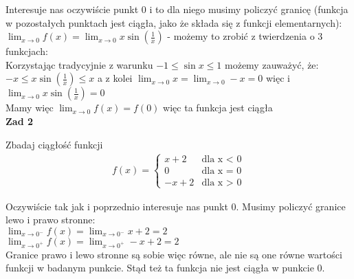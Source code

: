 \documentclass[main.tex]{subfiles}
\begin{document}
    \noindent Interesuje nas oczywiście punkt 0 i to dla niego musimy policzyć granicę (funkcja w pozostałych punktach jest ciągła, jako że składa się z funkcji elementarnych): \\

    \noindent $\lim_{x \to 0} f(x) = \lim_{x \to 0} x \sin(\frac{1}{x})$ - możemy to zrobić z twierdzenia o 3 funkcjach: \\

    \noindent Korzystając tradycyjnie z warunku $-1 \leq \sin{x} \leq 1$ możemy zauważyć, że: \\

    \noindent $-x \leq x \sin(\frac{1}{x}) \leq x$ a z kolei $\lim_{x \to 0} x = \lim_{x \to 0} -x = 0$ więc i $\lim_{x \to 0} x \sin(\frac{1}{x}) = 0$ \\

    \noindent Mamy więc $\lim_{x \to 0} f(x) = f(0)$ więc ta funkcja jest ciągła \\


    \noindent \textbf{Zad 2}

    \begin{exercise}
        Zbadaj ciągłość funkcji \begin{align*}
                                    f(x) =
                                    \begin{cases}
                                        x + 2 & \text{dla x $<$ 0} \\
                                        0 & \text{dla x = 0} \\
                                        -x + 2 & \text{dla x $>$ 0}
                                    \end{cases}
        \end{align*}
    \end{exercise}

    \noindent Oczywiście tak jak i poprzednio interesuje nas punkt 0. Musimy policzyć granice lewo i prawo stronne: \\

    \noindent $\lim_{x \to 0^{-}} f(x) = \lim_{x \to 0^{-}} x + 2 = 2$ \\
    \noindent $\lim_{x \to 0^{+}} f(x) = \lim_{x \to 0^{+}} -x + 2 = 2$ \\

    \noindent Granice prawo i lewo stronne są sobie więc równe, ale nie są one równe wartości funkcji w badanym punkcie.
    Stąd też ta funkcja nie jest ciągła w punkcie 0. \\
\end{document}

